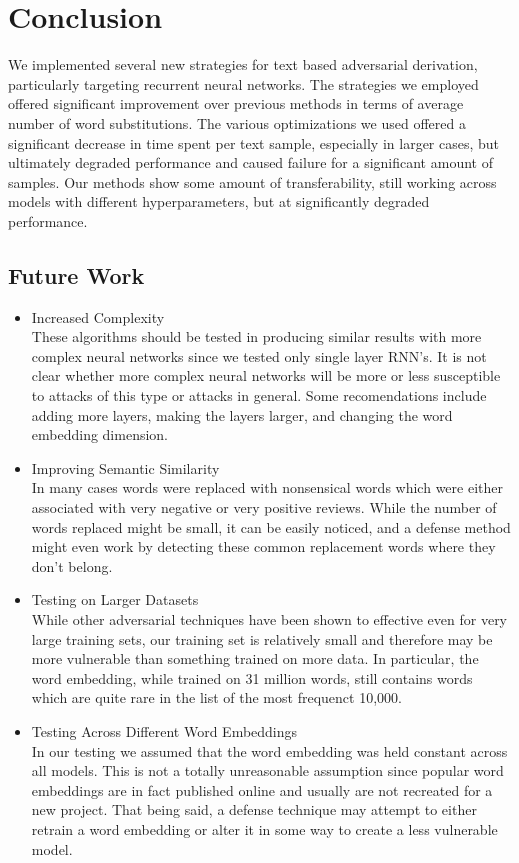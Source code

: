 \chapter{Conclusion}
We implemented several new strategies for text based adversarial derivation, particularly targeting recurrent neural networks.  The strategies we employed offered significant improvement over previous methods in terms of average number of word substitutions.  The various optimizations we used offered a significant decrease in time spent per text sample, especially in larger cases, but ultimately degraded performance and caused failure for a significant amount of samples.  Our methods show some amount of transferability, still working across models with different hyperparameters, but at significantly degraded performance.  
\section{Future Work}
\begin{itemize}
\item Increased Complexity\\
These algorithms should be tested in producing similar results with more complex neural networks since we tested only single layer RNN's.  It is not clear whether more complex neural networks will be more or less susceptible to attacks of this type or attacks in general.  Some recomendations include adding more layers, making the layers larger, and changing the word embedding dimension.

\item Improving Semantic Similarity\\
In many cases words were replaced with nonsensical words which were either associated with very negative or very positive reviews.  While the number of words replaced might be small, it can be easily noticed, and a defense method might even work by detecting these common replacement words where they don't belong.

\item Testing on Larger Datasets\\
While other adversarial techniques have been shown to effective even for very large training sets, our training set is relatively small and therefore may be more vulnerable than something trained on more data.  In particular, the word embedding, while trained on 31 million words, still contains words which are quite rare in the list of the most frequenct 10,000.

\item Testing Across Different Word Embeddings\\
In our testing we assumed that the word embedding was held constant across all models.  This is not a totally unreasonable assumption since popular word embeddings are in fact published online and usually are not recreated for a new project.  That being said, a defense technique may attempt to either retrain a word embedding or alter it in some way to create a less vulnerable model.
\end{itemize}
